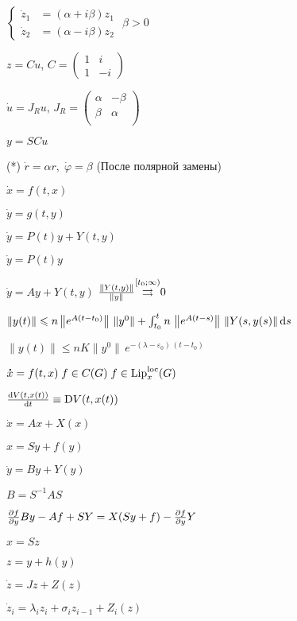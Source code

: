 \documentclass[hardcopy]{longnotes}
\DeclareMathOperator\Lip{Lip}
\def\Liploc{\Lip^{\rm loc}}
\begin{document}
\begin{list}
    $\left\{ 
      \begin{aligned}
        \dot z_1 &= (\alpha + i \beta)z_1 \\ \dot z_2 &= (\alpha - i \beta)z_2 
      \end{aligned}
    \right.$ \hfill $\beta >0$ 
  \item $z = Cu$, $C = \begin{pmatrix} 1&i\\1 & -i \end{pmatrix}$
  \item $\dot u = J_R u$, $J_R = 
    \begin{pmatrix}
      \alpha & -\beta \\
      \beta &  \alpha \\
    \end{pmatrix}$
  \item $y = SC u$
  \item[(*)] $\dot r = \alpha r, \; \dot\varphi  = \beta $ \hfill(После полярной замены)
    \nch
  \item $\dot x = f(t,x)$
  \item $\dot y = g(t,y)$
  \item $\dot y = P(t) y + Y(t,y)$
  \item $\dot y = P(t)y$
  \item $\dot y = Ay + Y(t,y)$ \hfill $\frac{\|Y(t,y)\|}{\|y\|} \overset{[t_0;\infty)}{\mathop{\rightrightarrows}\limits} 0 $
  \item $\|y(t)\| \leqslant n \left\|e^{A(t-t_0)}\right\|\, \|y^0\| + 
    \int_{t_0}^t n \, \left\|e^{A(t-s)}\right\| \, \|Y(s,y(s)\|\, \mathrm{d} s$
  \item $\|y(t)\| \leqslant n K \|y^0\|\, e^{-(\lambda- \varepsilon_0) \, (t-t_0)}$
    \skeq[3]
  \item $\dot x =f(t,x) \; f \in C(G) \; f \in \Liploc_x(G)$
  \item $\fder{V(t,x(t))}{t} \equiv \mathrm D V(t,x(t))$ 
    \nch
  \item $\dot x = Ax + X(x)$
  \item $x= Sy+f(y)$
  \item $\dot y = By + Y(y)$
  \item $B =  S^{-1} A S$
  \item $\pder fy B y - Af + SY = X(Sy + f) - \pder{f}{y} Y$
  \item $x = Sz$
  \item $z = y + h(y)$
  \item $\dot z= Jz+Z(z)$
  \item $\dot z_i = \lambda_i z_i + \sigma_i z_{i-1} + Z_i(z)$

\end{list}
\end{document}
